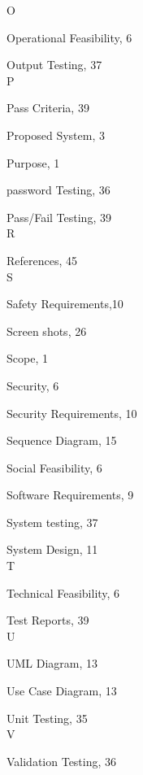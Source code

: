 \documentclass[12pt,a4paper,oneside]{report}
\begin{document}
\begin{theindex}
\hspace{.6in}\large O
\small
\item Operational Feasibility, 6
 \item Output Testing, 37\\
\hspace{.6in}\large P
\small  
\item Pass Criteria, 39
\item Proposed System, 3
\item Purpose, 1
\item password Testing, 36 
\item Pass/Fail Testing, 39 \\
\hspace{.6in}\large R
\small
\item References, 45\\ 
\hspace{.6in}\large S
\small
\item Safety Requirements,10  
\item Screen shots, 26 
\item Scope, 1
\item Security, 6
\item Security Requirements, 10  
\item Sequence Diagram, 15 
\item Social Feasibility, 6
\item Software Requirements, 9 
\item System testing, 37
\item System Design, 11\\
\hspace{.6in}\large T
\small
\item Technical Feasibility, 6
\item Test Reports, 39\\
\hspace{.6in}\large U
\small
\item UML Diagram, 13
\item Use Case Diagram, 13
\item Unit Testing, 35\\
\hspace{.6in}\large V
\small
\item Validation Testing, 36\\
\end{theindex}
\end{document}
